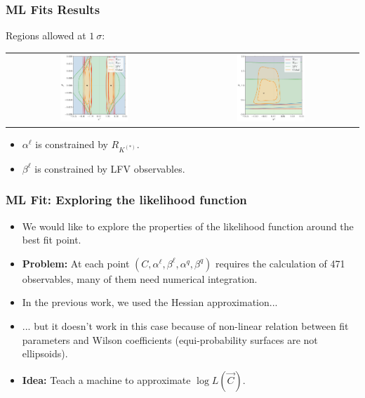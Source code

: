 \documentclass[mathserif, 10pt]{beamer}
\begin{document}
\begin{frame}\frametitle{ML Fits Results}
    Regions allowed at $1~\sigma$:
    \begin{center}
        \begin{tabular}{cc}
            \includegraphics[width=0.4\textwidth]{figures/alphabeta_l.pdf} & \includegraphics[width=0.4\textwidth]{figures/alphabeta_q.pdf}
        \end{tabular}
    \end{center}
    \begin{itemize}
        \item $\alpha^\ell$ is constrained by $R_{K^{(*)}}$.
        \item $\beta^\ell$ is constrained by LFV observables.
    \end{itemize}
\end{frame}

\begin{frame}\frametitle{ML Fit: Exploring the likelihood function}

    \begin{itemize}
        \item We would like to explore the properties of the likelihood function around the best fit point.
        \item {\bf Problem:} At each point $(C, \alpha^\ell, \beta^\ell, \alpha^q, \beta^q)$ requires the calculation of 471 observables, many of them need numerical integration.
        \item In the previous work, we used the Hessian approximation...

        \item ... but it doesn't work in this case because of non-linear relation between fit parameters and Wilson coefficients (equi-probability surfaces are not ellipsoids).
        \item {\bf Idea:} Teach a machine to approximate $\log L(\vec{C})$.
    \end{itemize}

\end{frame}
\end{document}
